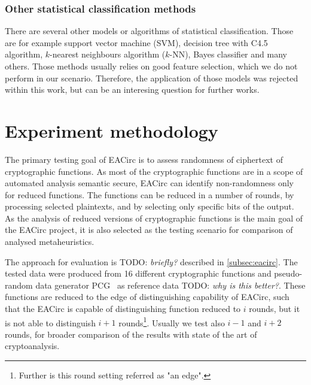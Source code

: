 \documentclass[
  print, %
  Table,   %
  nolof,     %
  nolot,     %
  11pt, %
  oneside  %
]{fithesis3}
\newcommand{\todo}[1]{TODO: \textit{#1}}
\begin{document}

\subsection{Other statistical classification methods}


There are several other models or algorithms of statistical classification. Those are for example support vector machine (SVM), decision tree with C4.5 algorithm, $k$-nearest neighbours algorithm ($k$-NN), Bayes classifier and many others. Those methods usually relies on good feature selection, which we do not perform in our scenario. Therefore, the application of those models was rejected within this work, but can be an interesing question for further works.

\chapter{Experiment methodology}
\label{chap:method}

The primary testing goal of EACirc is to assess randomness of ciphertext of cryptographic functions. As most of the cryptographic functions are in a scope of automated analysis semantic secure, EACirc can identify non-randomness only for reduced functions. The functions can be reduced in a number of rounds, by processing selected plaintexts, and by selecting only specific bits of the output. As the analysis of reduced versions of cryptographic functions is the main goal of the EACirc project, it is also selected as the testing scenario for comparison of analysed metaheuristics.

The approach for evaluation is \todo{briefly?} described in \cref{subsec:eacirc}. The tested data were produced from 16 different cryptographic functions and pseudo-random data generator PCG~\cite{pcgGen} as reference data \todo{why is this better?}. These functions are reduced to the edge of distinguishing capability of EACirc, such that the EACirc is capable of distinguishing function reduced to $i$ rounds, but it is not able to distinguish $i+1$ rounds\footnote{Further is this round setting referred as "an edge".}. Usually we test also $i-1$ and $i+2$ rounds, for broader comparison of the results with state of the art of cryptoanalysis.
\end{document}
